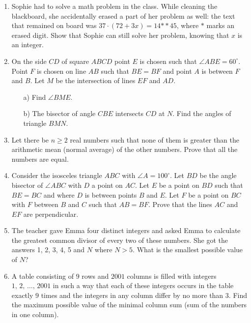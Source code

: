\documentclass[a4paper,12pt,titlepage]{article}
\begin{document}
\begin{enumerate}[1.]

\item %
Sophie had to solve a math problem in the class. While cleaning the blackboard, she accidentally erased a part of her problem as well: the text that remained on board was $37\cdot(72+3x)=14{**}45$, where $*$ marks an erased digit. Show that Sophie can still solve her problem, knowing that $x$ is an integer.


\item %
On the side $CD$ of square $ABCD$ point $E$ is chosen such that $\angle ABE = 60^{\circ}$. Point $F$ is chosen on line $AB$ such that $BE = BF$ and point $A$ is between $F$ and $B$. Let $M$ be the intersection of lines $EF$ and $AD$.
\begin{itemize}
\item [a)] Find $\angle BME$.
\item [b)] The bisector of angle $CBE$ intersects $CD$ at $N$. Find the angles of triangle $BMN$.
\end{itemize}


\item %
Let there be $n \geq 2$ real numbers such that none of them is greater than the arithmetic mean (normal average) of the other numbers. Prove that all the numbers are equal.


\item %
Consider the isosceles triangle $ABC$ with $\angle A = 100^{\circ}$. Let $BD$ be the angle bisector of $\angle ABC$ with $D$ a point on $AC$. Let $E$ be a point on $BD$ such that $BE=BC$ and where $D$ is between points $B$ and $E$. Let $F$ be a point on $BC$ with $F$ between $B$ and $C$ such that $AB=BF$. Prove that the lines $AC$ and $EF$ are perpendicular.


\item %
The teacher gave Emma four distinct integers and asked Emma to calculate the greatest common divisor of every two of these numbers. She got the answers 1, 2, 3, 4, 5 and $N$ where $N>5$. What is the smallest possible value of $N$?


\item %
A table consisting of $9$ rows and $2001$ columns is filled with integers $1,\,2,\,\ldots,\,2001$ in such a way that each of these integers occurs in the table exactly $9$ times and the integers in any column differ by no more than $3$. Find the maximum possible value of the minimal column sum (sum of the numbers in one column).



\end{enumerate}
\end{document}
